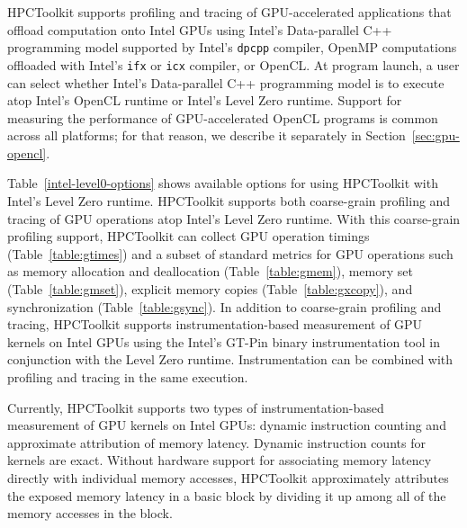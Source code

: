 HPCToolkit supports profiling and tracing of GPU-accelerated  applications that offload computation onto Intel GPUs using  Intel's Data-parallel C++ programming model supported by Intel's {\tt dpcpp} compiler, OpenMP computations offloaded with Intel's {\tt ifx} or {\tt icx} compiler, or OpenCL. At program launch, a user can select whether Intel's Data-parallel C++ programming model is to execute atop Intel's OpenCL runtime or Intel's Level Zero runtime. Support for measuring the performance of GPU-accelerated OpenCL programs is common across all platforms; for that reason, we describe it separately in Section~\ref{sec:gpu-opencl}.

Table~\ref{intel-level0-options} shows available options for using HPCToolkit with Intel's Level Zero runtime. HPCToolkit supports both coarse-grain profiling and tracing of GPU operations atop Intel's Level Zero runtime. With this coarse-grain profiling support, HPCToolkit can collect GPU operation timings (Table~\ref{table:gtimes}) and a subset of standard metrics for GPU operations such as memory allocation and deallocation (Table~\ref{table:gmem}), memory set (Table~\ref{table:gmset}), explicit memory copies (Table~\ref{table:gxcopy}), and synchronization (Table~\ref{table:gsync}). In addition to coarse-grain profiling and tracing, HPCToolkit supports instrumentation-based measurement of GPU kernels on Intel GPUs using the Intel's GT-Pin binary instrumentation tool in conjunction with the Level Zero runtime. Instrumentation can be combined with profiling and tracing in the same execution.

Currently, HPCToolkit supports two types of instrumentation-based measurement of GPU kernels on Intel GPUs: dynamic instruction counting and approximate attribution of memory latency. Dynamic instruction counts for kernels are exact. Without hardware support for associating memory latency directly with individual memory accesses, HPCToolkit approximately attributes the exposed memory latency in a basic block by dividing it up among all of the memory accesses in the block.

